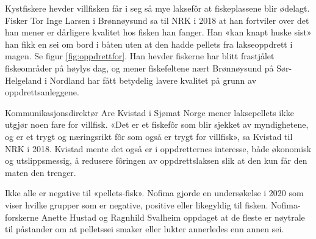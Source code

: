 Kystfiskere hevder villfisken får i seg så mye laksefôr at fiskeplassene blir ødelagt. Fisker Tor Inge Larsen i Brønnøysund sa til NRK i 2018 at han fortviler over det han mener er dårligere kvalitet hos fisken han fanger. Han «kan knapt huske sist» han fikk en sei om bord i båten uten at den hadde pellets fra lakseoppdrett i magen. Se figur \ref{fig:oppdrettfor}. Han hevder fiskerne har blitt frastjålet fiskeområder på høylys dag, og mener fiskefeltene nært Brønnøysund på Sør-Helgeland i Nordland har fått betydelig lavere kvalitet på grunn av oppdrettsanleggene. \cite{Olsen m.fl. 2018}

Kommunikasjonsdirektør Are Kvistad i Sjømat Norge mener laksepellets ikke utgjør noen fare for villfisk. «Det er et fiskefôr som blir sjekket av myndighetene, og er et trygt og næringsrikt fôr som også er trygt for villfisk», sa Kvistad til NRK i 2018. Kvistad mente det også er i oppdretternes interesse, både økonomisk og utslippsmessig, å redusere fôringen av oppdrettslaksen slik at den kun får den maten den trenger. \cite{Olsen m.fl. 2018}


Ikke alle er negative til «pellets-fisk». Nofima gjorde en undersøkelse i 2020 som viser hvilke grupper som er negative, positive eller likegyldig til fisken. Nofima-forskerne Anette Hustad og Ragnhild Svalheim oppdaget at de fleste er nøytrale til påstander om at pelletssei smaker eller lukter annerledes enn annen sei. \cite{Hustad og Svalheim 2020}

